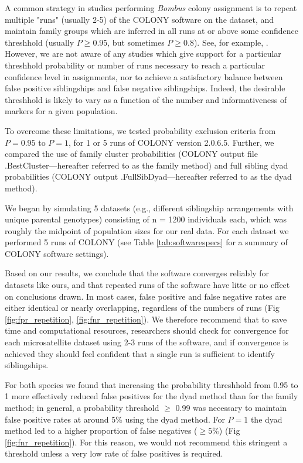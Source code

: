 \documentclass[12pt]{article}
\begin{document}
A common strategy in studies performing \emph{Bombus} colony assignment is to repeat multiple "runs" (usually 2-5) of the COLONY software on the dataset, and maintain family groups which are inferred in all runs at or above some confidence threshhold (usually $P \ge 0.95$, but sometimes $P \ge 0.8$). See, for example, \textcite{carvellMolecularSpatialAnalyses2012, raoBumbleBeeHymenoptera2012, dreierFinescaleSpatialGenetic2014a, geibBumbleBeeNest2015a, carvellBumblebeeFamilyLineage2017a, molaWildfireRevealsTransient2020a}. However, we are not aware of any studies which give support for a particular threshhold probability or number of runs necessary to reach a particular confidence level in assignments, nor to achieve a satisfactory balance between false positive siblingships and false negative siblingships. Indeed, the desirable threshhold is likely to vary as a function of the number and informativeness of markers for a given population.

To overcome these limitations, we tested probability exclusion criteria from $P = 0.95$ to $P = 1$, for 1 or 5 runs of COLONY version 2.0.6.5. Further, we compared the use of family cluster probabilities (COLONY output file .BestCluster---hereafter referred to as the family method) and full sibling dyad probabilities (COLONY output .FullSibDyad---hereafter referred to as the dyad method).

We began by simulating 5 datasets (e.g., different siblingship arrangements with unique parental genotypes) consisting of n = 1200 individuals each, which was roughly the midpoint of population sizes for our real data. For each dataset we performed 5 runs of COLONY (see Table \ref{tab:softwarespecs} for a summary of COLONY software settings).

Based on our results, we conclude that the software converges reliably for datasets like ours, and that repeated runs of the software have litte or no effect on conclusions drawn. In most cases, false positive and false negative rates are either identical or nearly overlapping, regardless of the numbers of runs (Fig \ref{fig:fpr_repetition}, \ref{fig:fnr_repetition}). We therefore recommend that to save time and computational resources, researchers should check for convergence for each microsatellite dataset using 2-3 runs of the software, and if convergence is achieved they should feel confident that a single run is sufficient to identify siblingships.

For both species we found that increasing the probability threshhold from 0.95 to 1 more effectively reduced false positives for the dyad method than for the family method; in general, a probability threshold $\ge$ 0.99 was necessary to maintain false positive rates at around 5\% using the dyad method. For $P = 1$ the dyad method led to a higher proportion of false negatives ($\ge 5\%$) (Fig \ref{fig:fnr_repetition}). For this reason, we would not recommend this stringent a threshold unless a very low rate of false positives is required.
\end{document}

